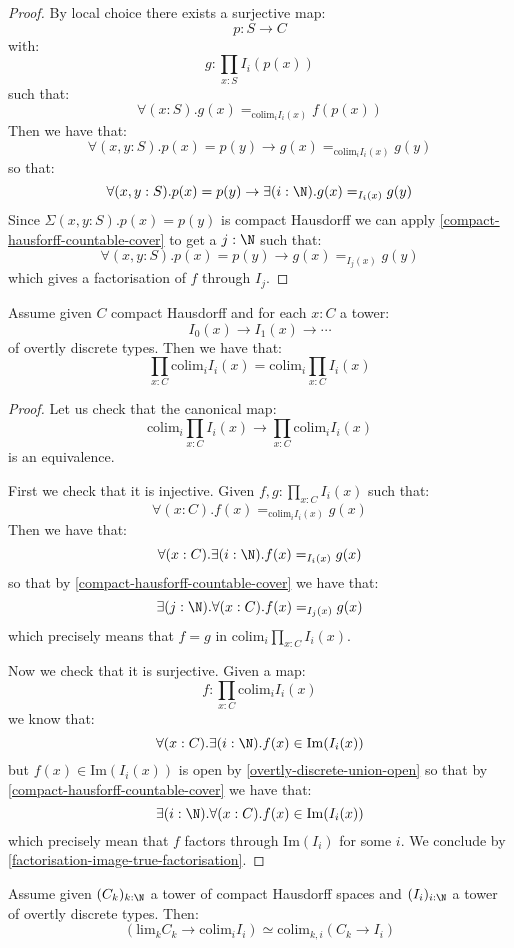 \begin{proof}
By local choice there exists a surjective map:
\[p:S\to C\]
with:
\[g:\prod_{x:S} I_i(p(x))\]
such that:
\[\forall(x:S). g(x) =_{\mathrm{colim}_i I_i(x)} f(p(x))\]
Then we have that:
\[\forall(x,y:S). p(x)=p(y) \to g(x) =_{\mathrm{colim}_i I_i(x)} g(y)\]
so that:
\[\forall(x,y:S). p(x)=p(y) \to \exists(i:\N). g(x) =_{I_i(x)} g(y)\]
Since $\Sigma(x,y:S). p(x)=p(y)$ is compact Hausdorff we can apply \cref{compact-hausforff-countable-cover} to get a $j:\N$ such that:
\[\forall(x,y:S). p(x)=p(y) \to g(x) =_{I_j(x)} g(y)\]
which gives a factorisation of $f$ through $I_j$.
\end{proof}

\begin{lemma}\label{scott-continuity-right}
Assume given $C$ compact Hausdorff and for each $x:C$ a tower:
\[I_0(x)\to I_1(x)\to \cdots\]
of overtly discrete types. Then we have that:
\[\prod_{x:C} \mathrm{colim}_{i} I_i(x) = \mathrm{colim}_{i} \prod_{x:C} I_i(x)\]
\end{lemma}

\begin{proof}
Let us check that the canonical map:
\[\mathrm{colim}_i \prod_{x:C} I_i(x) \to \prod_{x:C} \mathrm{colim}_i I_i(x) \]
is an equivalence. 

First we check that it is injective. Given $f,g:\prod_{x:C} I_i(x)$ such that:
\[\forall(x:C).  f(x) =_{\mathrm{colim}_iI_i(x)} g(x)\]
Then we have that:
\[\forall(x:C).  \exists(i:\N). f(x) =_{I_i(x)} g(x)\]
so that by \cref{compact-hausforff-countable-cover} we have that:
\[\exists(j:\N). \forall(x:C). f(x) =_{I_j(x)} g(x)\]
which precisely means that $f=g$ in $\mathrm{colim}_i \prod_{x:C} I_i(x)$.

Now we check that it is surjective. Given a map:
\[f: \prod_{x:C} \mathrm{colim}_i I_i(x)\]
we know that:
\[\forall(x:C). \exists(i:\N). f(x)\in \mathrm{Im}(I_i(x))\]
but $f(x)\in \mathrm{Im}(I_i(x))$ is open by \cref{overtly-discrete-union-open} so that by \cref{compact-hausforff-countable-cover} we have that:
\[\exists(i:\N). \forall(x:C).  f(x)\in \mathrm{Im}(I_i(x))\]
which precisely mean that $f$ factors through $\mathrm{Im}(I_i)$ for some $i$. We conclude by \cref{factorisation-image-true-factorisation}.
\end{proof}

\begin{theorem}\label{scott-continuity}
Assume given $(C_k)_{k:\N}$ a tower of compact Hausdorff spaces and $(I_i)_{i:\N}$ a tower of overtly discrete types. Then:
\[\left( \mathrm{lim}_k C_k \to \mathrm{colim}_i I_i\right) \simeq \mathrm{colim}_{k,i} (C_k\to I_i)\]
\end{theorem}

